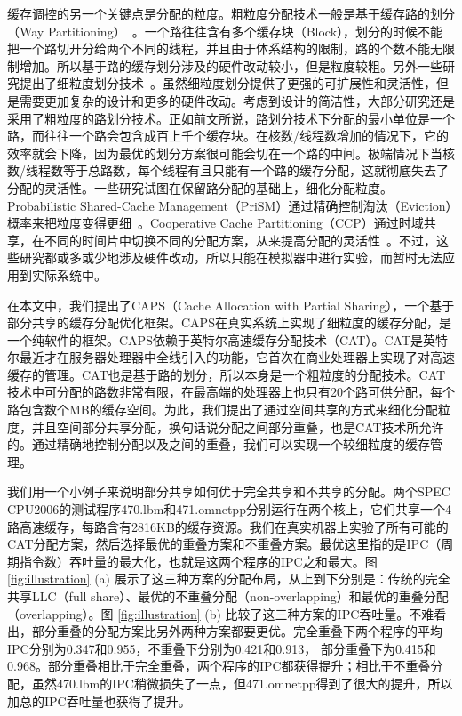 缓存调控的另一个关键点是分配的粒度。粗粒度分配技术一般是基于缓存路的划分（Way Partitioning）~\parencite{suh2004dynamic,qureshi2006utility,qureshi2007adaptive,hsu2006communist,iyer2004cqos,kim2004fair,rafique2006architectural,xie2009pipp}。一个路往往含有多个缓存块（Block），划分的时候不能把一个路切开分给两个不同的线程，并且由于体系结构的限制，路的个数不能无限制增加。所以基于路的缓存划分涉及的硬件改动较小，但是粒度较粗。另外一些研究提出了细粒度划分技术~\parencite{sanchez2011vantage,manikantan2012probabilistic,chang2014cooperative}。虽然细粒度划分提供了更强的可扩展性和灵活性，但是需要更加复杂的设计和更多的硬件改动。考虑到设计的简洁性，大部分研究还是采用了粗粒度的路划分技术。正如前文所说，路划分技术下分配的最小单位是一个路，而往往一个路会包含成百上千个缓存块。在核数/线程数增加的情况下，它的效率就会下降，因为最优的划分方案很可能会切在一个路的中间。极端情况下当核数/线程数等于总路数，每个线程有且只能有一个路的缓存分配，这就彻底失去了分配的灵活性。一些研究试图在保留路分配的基础上，细化分配粒度。Probabilistic Shared-Cache Management（PriSM）通过精确控制淘汰（Eviction）概率来把粒度变得更细~\parencite{manikantan2012probabilistic}。Cooperative Cache Partitioning（CCP）通过时域共享，在不同的时间片中切换不同的分配方案，从来提高分配的灵活性~\parencite{chang2014cooperative}。不过，这些研究都或多或少地涉及硬件改动，所以只能在模拟器中进行实验，而暂时无法应用到实际系统中。

在本文中，我们提出了CAPS（Cache Allocation with Partial Sharing），一个基于部分共享的缓存分配优化框架。CAPS在真实系统上实现了细粒度的缓存分配，是一个纯软件的框架。CAPS依赖于英特尔高速缓存分配技术（CAT）。CAT是英特尔最近才在服务器处理器中全线引入的功能，它首次在商业处理器上实现了对高速缓存的管理。CAT也是基于路的划分，所以本身是一个粗粒度的分配技术。CAT技术中可分配的路数非常有限，在最高端的处理器上也只有20个路可供分配，每个路包含数个MB的缓存空间。为此，我们提出了通过空间共享的方式来细化分配粒度，并且空间部分共享分配，换句话说分配之间部分重叠，也是CAT技术所允许的。通过精确地控制分配以及之间的重叠，我们可以实现一个较细粒度的缓存管理。

我们用一个小例子来说明部分共享如何优于完全共享和不共享的分配。两个SPEC CPU2006的测试程序470.lbm和471.omnetpp分别运行在两个核上，它们共享一个4路高速缓存，每路含有2816KB的缓存资源。我们在真实机器上实验了所有可能的CAT分配方案，然后选择最优的重叠方案和不重叠方案。最优这里指的是IPC（周期指令数）吞吐量的最大化，也就是这两个程序的IPC之和最大。图 \ref{fig:illustration} (a) 展示了这三种方案的分配布局，从上到下分别是：传统的完全共享LLC（full share）、最优的不重叠分配（non-overlapping）和最优的重叠分配（overlapping）。图 \ref{fig:illustration} (b) 比较了这三种方案的IPC吞吐量。不难看出，部分重叠的分配方案比另外两种方案都要更优。完全重叠下两个程序的平均IPC分别为0.347和0.955，不重叠下分别为0.421和0.913， 部分重叠下为0.415和0.968。部分重叠相比于完全重叠，两个程序的IPC都获得提升；相比于不重叠分配，虽然470.lbm的IPC稍微损失了一点，但471.omnetpp得到了很大的提升，所以加总的IPC吞吐量也获得了提升。

